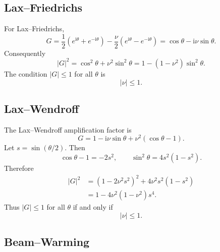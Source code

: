 \documentclass[11pt]{article}
\newcommand{\ii}{\mathrm{i}}
\begin{document}
\subsection{Lax--Friedrichs}

For Lax--Friedrichs,
\begin{equation}
    G=\frac12(e^{\ii\theta}+e^{-\ii\theta})
    -\frac{\nu}{2}(e^{\ii\theta}-e^{-\ii\theta})
    =
    \cos\theta-\ii\nu\sin\theta.
\end{equation}
Consequently
\begin{equation}
    |G|^2=\cos^2\theta+\nu^2\sin^2\theta
    =
    1-(1-\nu^2)\sin^2\theta.
\end{equation}
The condition $|G|\le1$ for all $\theta$ is
\begin{equation}
    |\nu|\le1.
\end{equation}

\subsection{Lax--Wendroff}

The Lax--Wendroff amplification factor is
\begin{equation}
    G
    =
    1-\ii\nu\sin\theta+\nu^2(\cos\theta-1).
\end{equation}
Let $s=\sin(\theta/2)$.  Then
\begin{equation}
    \cos\theta-1=-2s^2,\qquad
    \sin^2\theta=4s^2(1-s^2).
\end{equation}
Therefore
\begin{align}
    |G|^2
    &=
    (1-2\nu^2s^2)^2+4\nu^2s^2(1-s^2)\\
    &=
    1-4\nu^2(1-\nu^2)s^4.
\end{align}
Thus $|G|\le1$ for all $\theta$ if and only if
\begin{equation}
    |\nu|\le1.
\end{equation}

\subsection{Beam--Warming}
\end{document}
